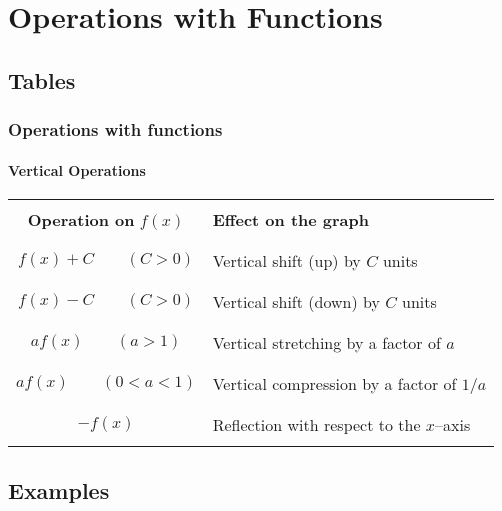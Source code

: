 \documentclass[9pt,xcolor=x11names,compress]{beamer}
\begin{document}
\section{Operations with Functions}
\subsection{Tables}
\begin{frame}\frametitle{Operations with functions}
\framesubtitle{Vertical Operations}
\begin{center}
   \begin{tabular}{c||l} 
   \rowcolor{DeepSkyBlue4} &\\
   \rowcolor{DeepSkyBlue4}
   \textbf{Operation on }$f(x)$ & \textbf{Effect on the graph} \\
   \rowcolor{DeepSkyBlue4} & \pause \\ 
   & \\ $f(x)+C\qquad (C>0)$ & Vertical shift (up) by $C$ units \\
   & \pause \\ 
   \rowcolor{white} &\\ \rowcolor{white}
   $f(x)-C\qquad (C>0)$ & Vertical shift (down) by $C$ units \\
   \rowcolor{white} & \pause \\ 
   &\\ $a f(x)\qquad (a>1)$ & Vertical stretching by a factor of $a$ \\
   & \pause \\ 
   \rowcolor{white} &\\
   \rowcolor{white}
   $a f(x)\qquad (0<a<1)$ & Vertical compression by a factor of $1/a$ \\
   \rowcolor{white} & \pause \\ 
   &\\ $-f(x)$ & Reflection with respect to the $x$--axis  \\ & \\
   \end{tabular}
   \end{center}
\end{frame}

\subsection{Examples}
\end{document}
